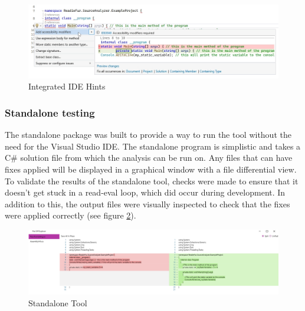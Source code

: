 \begin{figure}[H]
    \vspace{-10px}
    \centering
    \caption{Integrated IDE Hints}
    \label{fig:IDEHints}
    \includegraphics[width=\textwidth]{Figures/IDEHintsCropped.png}
\end{figure}

\subsubsection{Standalone testing}
The standalone package was built to provide a way to run the tool without the need for the Visual Studio IDE. The standalone program is simplistic and takes a C\# solution file from which the analysis can be run on. Any files that can have fixes applied will be displayed in a graphical window with a file differential view. To validate the results of the standalone tool, checks were made to ensure that it doesn't get stuck in a read-eval loop, which did occur during development. In addition to this, the output files were visually inspected to check that the fixes were applied correctly (see figure \ref{fig:StandaloneTool}).

\begin{figure}[H]
    \centering
    \caption{Standalone Tool}
    \label{fig:StandaloneTool}
    \includegraphics[width=\textwidth]{Figures/StandaloneToolCropped.png}
\end{figure}
